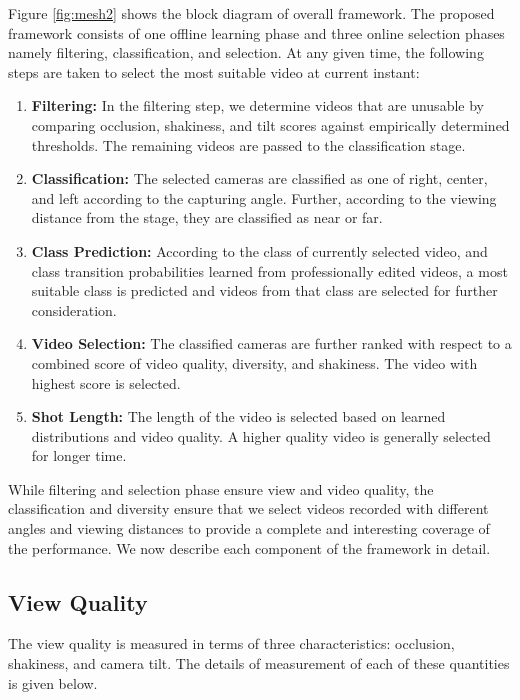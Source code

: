\documentclass{sig-alternate}
\begin{document}
Figure \ref{fig:mesh2} shows the block diagram of overall framework. The proposed framework consists of one offline learning phase and three online selection phases namely filtering, classification, and selection. At any given time, the following steps are taken to select the most suitable video at current instant:

\begin{enumerate}
  \item \textbf{Filtering:} In the filtering step, we determine videos that are unusable by comparing occlusion, shakiness, and tilt scores
against empirically determined thresholds. The remaining videos are passed to the classification stage.
  \item \textbf{Classification:} The selected cameras are classified as one of right, center, and left according to the capturing angle. Further, according to the viewing distance from the stage, they are classified as near or far.

\item \textbf{ Class Prediction:} According to the class of currently selected video, and class transition probabilities learned from professionally edited videos, a most suitable class is predicted and videos from that class are selected for further consideration.

\item \textbf{Video Selection:} The classified cameras are further ranked with respect to a combined score of video quality, diversity,
and shakiness. The video with highest score is selected.

\item \textbf{Shot Length:} The length of the video is selected based on learned distributions and video quality. A higher quality video is generally selected for longer time.
\end{enumerate}

While filtering and selection phase ensure view and video quality, the classification and diversity ensure that we select videos recorded with different angles and viewing distances to provide a complete and interesting coverage of the performance. We now describe each component of the framework in detail.

\subsection{View Quality}
The view quality is measured in terms of three characteristics:
occlusion, shakiness, and camera tilt. The details of measurement
of each of these quantities is given below.
\end{document}
